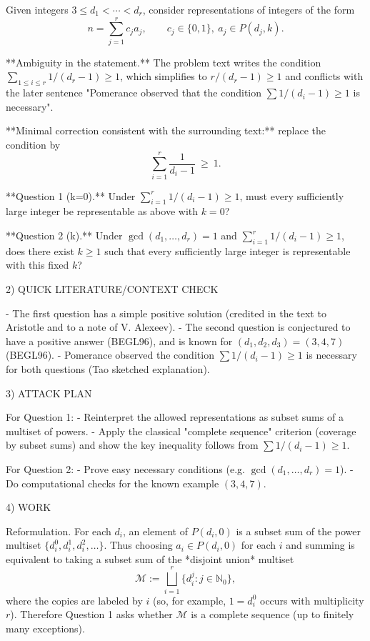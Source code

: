 Given integers $3\le d_1<\cdots<d_r$, consider representations of integers of the form
\[
 n = \sum_{j=1}^r c_j a_j, \qquad c_j\in\{0,1\},\ a_j\in P(d_j,k).
\]

**Ambiguity in the statement.** The problem text writes the condition
$\sum_{1\le i\le r} 1/(d_r-1)\ge 1$, which simplifies to $r/(d_r-1)\ge 1$ and conflicts with the later sentence "Pomerance observed that the condition $\sum 1/(d_i-1)\ge 1$ is necessary".

**Minimal correction consistent with the surrounding text:** replace the condition by
\[
\sum_{i=1}^r \frac{1}{d_i-1}\ \ge\ 1.
\]

**Question 1 (k=0).** Under $\sum_{i=1}^r 1/(d_i-1)\ge 1$, must every sufficiently large integer be representable as above with $k=0$?

**Question 2 (k).** Under $\gcd(d_1,\dots,d_r)=1$ and $\sum_{i=1}^r 1/(d_i-1)\ge 1$, does there exist $k\ge 1$ such that every sufficiently large integer is representable with this fixed $k$?

2) QUICK LITERATURE/CONTEXT CHECK

- The first question has a simple positive solution (credited in the text to Aristotle and to a note of V. Alexeev).
- The second question is conjectured to have a positive answer (BEGL96), and is known for $(d_1,d_2,d_3)=(3,4,7)$ (BEGL96).
- Pomerance observed the condition $\sum 1/(d_i-1)\ge 1$ is necessary for both questions (Tao sketched explanation).

3) ATTACK PLAN

For Question 1:
- Reinterpret the allowed representations as subset sums of a multiset of powers.
- Apply the classical "complete sequence" criterion (coverage by subset sums) and show the key inequality follows from $\sum 1/(d_i-1)\ge 1$.

For Question 2:
- Prove easy necessary conditions (e.g. $\gcd(d_1,\dots,d_r)=1$).
- Do computational checks for the known example $(3,4,7)$.

4) WORK

Reformulation.
For each $d_i$, an element of $P(d_i,0)$ is a subset sum of the power multiset $\{d_i^0,d_i^1,d_i^2,\dots\}$.
Thus choosing $a_i\in P(d_i,0)$ for each $i$ and summing is equivalent to taking a subset sum of the *disjoint union* multiset
\[
\mathcal{M}:=\bigsqcup_{i=1}^r \{d_i^j: j\in\mathbb{N}_0\},
\]
where the copies are labeled by $i$ (so, for example, $1=d_i^0$ occurs with multiplicity $r$).
Therefore Question 1 asks whether $\mathcal{M}$ is a complete sequence (up to finitely many exceptions).

